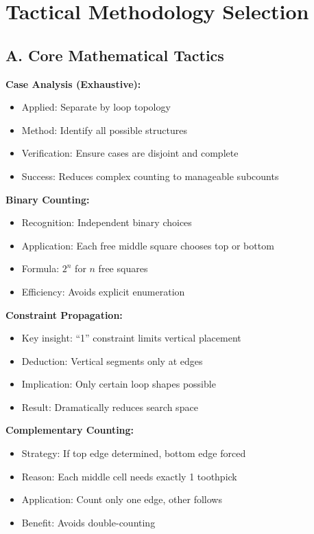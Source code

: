 \documentclass[12pt]{article}
\begin{document}
\section{Tactical Methodology Selection}

\begin{tacticalbox}

\subsection*{A. Core Mathematical Tactics}

\textbf{Case Analysis (Exhaustive):}
\begin{itemize}
    \item Applied: Separate by loop topology
    \item Method: Identify all possible structures
    \item Verification: Ensure cases are disjoint and complete
    \item Success: Reduces complex counting to manageable subcounts
\end{itemize}

\textbf{Binary Counting:}
\begin{itemize}
    \item Recognition: Independent binary choices
    \item Application: Each free middle square chooses top or bottom
    \item Formula: $2^n$ for $n$ free squares
    \item Efficiency: Avoids explicit enumeration
\end{itemize}

\textbf{Constraint Propagation:}
\begin{itemize}
    \item Key insight: ``1'' constraint limits vertical placement
    \item Deduction: Vertical segments only at edges
    \item Implication: Only certain loop shapes possible
    \item Result: Dramatically reduces search space
\end{itemize}

\textbf{Complementary Counting:}
\begin{itemize}
    \item Strategy: If top edge determined, bottom edge forced
    \item Reason: Each middle cell needs exactly 1 toothpick
    \item Application: Count only one edge, other follows
    \item Benefit: Avoids double-counting
\end{itemize}


\end{tacticalbox}
\end{document}
